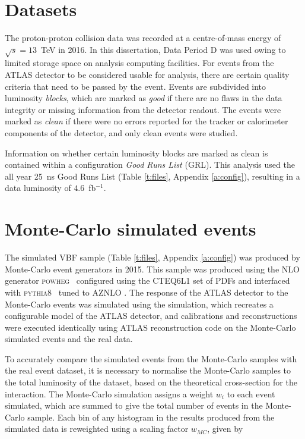 	\section{Datasets}

	The proton-proton collision data was recorded at a centre-of-mass energy of $\sqrt{s}=13$~TeV in 2016. In this dissertation, Data Period D was used owing to limited storage space on analysis computing facilities. For events from the ATLAS detector to be considered usable for analysis, there are certain quality criteria that need to be passed by the event. Events are subdivided into luminosity \textit{blocks}, which are marked as \textit{good} if there are no flaws in the data integrity or missing information from the detector readout. The events were marked as \textit{clean} if there were no errors reported for the tracker or calorimeter components of the detector, and only clean events were studied.

	Information on whether certain luminosity blocks are marked as clean is contained within a configuration \textit{Good Runs List} (GRL). This analysis used the all year 25~ns Good Runs List (Table \ref{t:files}, Appendix \ref{a:config}), resulting in a data luminosity of $4.6$~fb$^{-1}$.

	\section{Monte-Carlo simulated events}

		 The simulated VBF sample (Table \ref{t:files}, Appendix \ref{a:config}) was produced by Monte-Carlo event generators in 2015. This sample was produced using the NLO generator \textsc{powheg}~\cite{powheg} configured using the CTEQ6L1 \cite{CTEQ} set of PDFs and interfaced with \textsc{pythia8}~\cite{pythia} tuned to AZNLO \cite{AZNLO}. The response of the ATLAS detector to the Monte-Carlo events was simulated using the  \cite{geant4, geant4atlas} simulation, which recreates a configurable model of the ATLAS detector, and calibrations and reconstructions were executed identically using ATLAS reconstruction code on the Monte-Carlo simulated events and the real  data.

		 To accurately compare the simulated events from the Monte-Carlo samples with the real event dataset, it is necessary to normalise the Monte-Carlo samples to the total luminosity of the dataset, based on the theoretical cross-section for the interaction. The Monte-Carlo simulation assigns a weight $w_i$ to each event simulated, which are summed to give the total number of events in the Monte-Carlo sample. Each bin of any histogram in the results produced from the simulated data is reweighted using a scaling factor $w_{MC}$, given by

